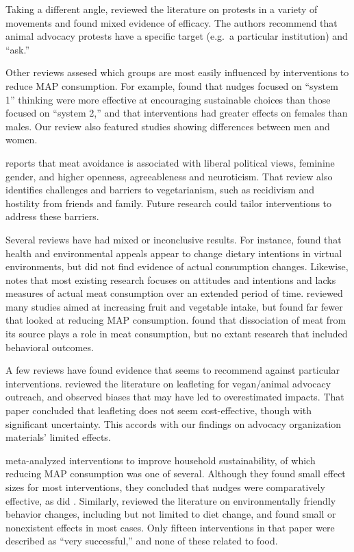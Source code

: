 \documentclass[sn-nature,referee,pdflatex]{sn-jnl}
\begin{document}
Taking a different angle, \citep{adleberg2018} reviewed the literature
on protests in a variety of movements and found mixed evidence of
efficacy. The authors recommend that animal advocacy protests have a
specific target (e.g.~a particular institution) and ``ask.''

Other reviews assesed which groups are most easily influenced by
interventions to reduce MAP consumption. For example,
\citep{blackford2021} found that nudges focused on ``system 1'' thinking
were more effective at encouraging sustainable choices than those
focused on ``system 2,'' and that interventions had greater effects on
females than males. Our review also featured studies showing differences
between men and women.

\citep{rosenfeld2018} reports that meat avoidance is associated with
liberal political views, feminine gender, and higher openness,
agreeableness and neuroticism. That review also identifies challenges
and barriers to vegetarianism, such as recidivism and hostility from
friends and family. Future research could tailor interventions to
address these barriers.

Several reviews have had mixed or inconclusive results. For instance,
\citep{bianchi2018conscious} found that health and environmental appeals
appear to change dietary intentions in virtual environments, but did not
find evidence of actual consumption changes. Likewise,
\citep{kwasny2022} notes that most existing research focuses on
attitudes and intentions and lacks measures of actual meat consumption
over an extended period of time. \citep{taufik2019} reviewed many
studies aimed at increasing fruit and vegetable intake, but found far
fewer that looked at reducing MAP consumption. \citep{benningstad2020}
found that dissociation of meat from its source plays a role in meat
consumption, but no extant research that included behavioral outcomes.

A few reviews have found evidence that seems to recommend against
particular interventions. \citep{greig2017} reviewed the literature on
leafleting for vegan/animal advocacy outreach, and observed biases that
may have led to overestimated impacts. That paper concluded that
leafleting does not seem cost-effective, though with significant
uncertainty. This accords with our findings on advocacy organization
materials' limited effects.

\citep{nisa2019} meta-analyzed interventions to improve household
sustainability, of which reducing MAP consumption was one of several.
Although they found small effect sizes for most interventions, they
concluded that nudges were comparatively effective, as did
\citep{ensaff2021}. Similarly, \citep{rau2022} reviewed the literature
on environmentally friendly behavior changes, including but not limited
to diet change, and found small or nonexistent effects in most cases.
Only fifteen interventions in that paper were described as ``very
successful,'' and none of these related to food.
\end{document}
